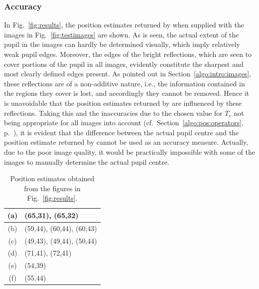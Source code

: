 \subsubsection{Accuracy}

In Fig.~\ref{fig:results}, the position estimates returned by
{\octopus} when supplied with the images in Fig.~\ref{fig:testimages}
are shown.  As is seen, the actual extent of the pupil in the images
can hardly be determined visually, which imply relatively weak pupil
edges.  Moreover, the edges of the bright reflections, which are seen
to cover portions of the pupil in all images, evidently constitute the
sharpest and most clearly defined edges present.  As pointed out in
Section~\ref{algo:intro:images}, these reflections are of a
non-additive nature, i.e., the information contained in the regions
they cover is lost, and accordingly they cannot be removed.  Hence it
is unavoidable that the position estimates returned by {\octopus} are
influenced by these reflections.  Taking this and the inaccuracies
due to the chosen value for $T_{e}$ not being appropriate for all
images into account (cf.\ Section~\ref{algo:pos:operators},
p.~\pageref{pg:TEproblems}), it is evident that the difference between
the actual pupil centre and the position estimate returned by
{\octopus} cannot be used as an accuracy measure.  Actually, due to
the poor image quality, it would be practically impossible with some
of the images to manually determine the actual pupil centre.

\begin{table}[tb]
  \begin{center}
    \begin{tabular}{|c|l|}               \hline
      (a) & (65,31), (65,32)          \\ \hline
      (b) & (59,44), (60,44), (60,43) \\ \hline
      (c) & (49,43), (49,44), (50,44) \\ \hline
      (d) & (71,41), (72,41)          \\ \hline
      (e) & (54,39)                   \\ \hline
      (f) & (55,44)                   \\ \hline
    \end{tabular}
  \end{center}
  \caption{\label{tab:estimates}Position estimates obtained from 
    the figures in Fig.~\protect\ref{fig:results}.}
\end{table}

